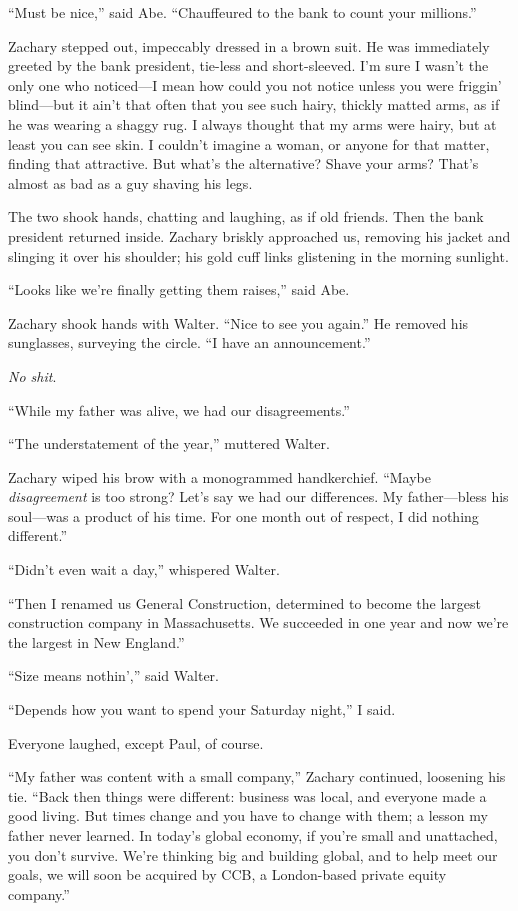 ``Must be nice,'' said Abe. ``Chauffeured to the bank to count your
millions.''

Zachary stepped out, impeccably dressed in a brown suit. He was
immediately greeted by the bank president, tie-less and short-sleeved.
I'm sure I wasn't the only one who noticed---I mean how could you not
notice unless you were friggin' blind---but it ain't that often that you
see such hairy, thickly matted arms, as if he was wearing a shaggy rug.
I always thought that my arms were hairy, but at least you can see skin.
I couldn't imagine a woman, or anyone for that matter, finding that
attractive. But what's the alternative? Shave your arms? That's almost
as bad as a guy shaving his legs.

The two shook hands, chatting and laughing, as if old friends. Then the
bank president returned inside. Zachary briskly approached us, removing
his jacket and slinging it over his shoulder; his gold cuff links
glistening in the morning sunlight.

``Looks like we're finally getting them raises,'' said Abe.

Zachary shook hands with Walter. ``Nice to see you again.'' He removed
his sunglasses, surveying the circle. ``I have an announcement.''

\emph{No shit}.

``While my father was alive, we had our disagreements.''

``The understatement of the year,'' muttered Walter.

Zachary wiped his brow with a monogrammed handkerchief. \linebreak ``Maybe
\emph{disagreement} is too strong? Let's say we had our differences. My
father---bless his soul---was a product of his time. For one month out
of respect, I did nothing different.''

``Didn't even wait a day,'' whispered Walter.

``Then I renamed us General Construction, determined to become the
largest construction company in Massachusetts. We succeeded in one year
and now we're the largest in New England.''

``Size means nothin','' said Walter.

``Depends how you want to spend your Saturday night,'' I said.

Everyone laughed, except Paul, of course.

``My father was content with a small company,'' Zachary continued,
loosening his tie. ``Back then things were different: business was
local, and everyone made a good living. But times change and you have to
change with them; a lesson my father never learned. In today's global
economy, if you're small and unattached, you don't survive. We're
thinking big and building global, and to help meet our goals, we will
soon be acquired by CCB, a London-based private equity company.''

